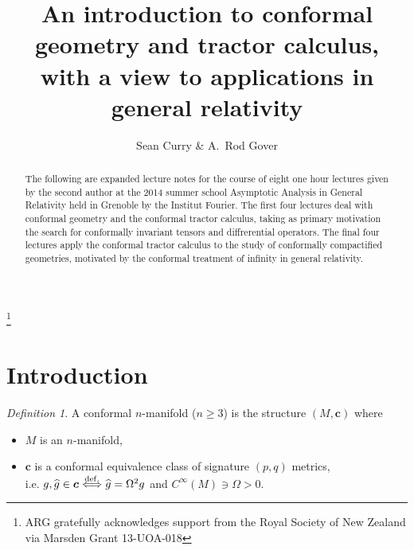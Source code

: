 \documentclass[a4paper,12pt]{amsart}
\author{Sean Curry \& A.\ Rod Gover}
\title{An introduction to conformal geometry and tractor calculus, with a view to applications in general relativity}
\newcommand{\cc}{\boldsymbol{c}}
\theoremstyle{remark}
\newtheorem{definition}{Definition}
\begin{document}





\begin{abstract}
The following are expanded lecture notes for the course of eight one
hour lectures given by the second author at the 2014 summer school
Asymptotic Analysis in General Relativity held in Grenoble by the
Institut Fourier. The first four lectures deal with conformal geometry
and the conformal tractor calculus, taking as primary motivation the
search for conformally invariant tensors and diffrerential
operators. The final four lectures apply the conformal tractor
calculus to the study of conformally compactified geometries,
motivated by the conformal treatment of infinity in general
relativity.
\end{abstract}

\maketitle

\pagestyle{myheadings} 


\tableofcontents

\thanks{ARG gratefully acknowledges support from the Royal
  Society of New Zealand via Marsden Grant 13-UOA-018 }

\section{Introduction}

\begin{definition}\label{cman}
\noindent A conformal $n$-manifold ($n\geq 3$) is the structure $(M,\cc)$ where
\begin{itemize}
\item $M$ is an $n$-manifold,
\item $\cc$ is a  conformal equivalence class of signature $(p,q)$ metrics,\\ i.e. $g,\widehat{g}\in \cc\stackrel{{\rm def.}}{\Longleftrightarrow} \widehat{g}=\Omega^2 g$ and $C^\infty(M)\ni\Omega>0$.
\end{itemize}
\end{definition}
\end{document}
